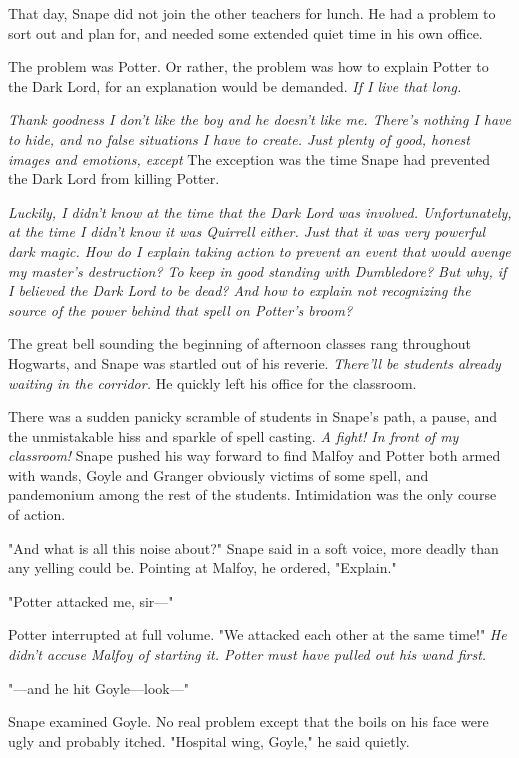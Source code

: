 That day, Snape did not join the other teachers for lunch. He had a problem to sort out and plan for, and needed some extended quiet time in his own office.

The problem was Potter. Or rather, the problem was how to explain Potter to the Dark Lord, for an explanation would be demanded. \emph{If I live that long.}

\emph{Thank goodness I don't like the boy and he doesn't like me. There's nothing I have to hide, and no false situations I have to create. Just plenty of good, honest images and emotions, except{\el}} The exception was the time Snape had prevented the Dark Lord from killing Potter.

\emph{Luckily, I didn't know at the time that the Dark Lord was involved. Unfortunately, at the time I didn't know it was Quirrell either. Just that it was very powerful dark magic. How do I explain taking action to prevent an event that would avenge my master's destruction? To keep in good standing with Dumbledore? But why, if I believed the Dark Lord to be dead? And how to explain not recognizing the source of the power behind that spell on Potter's broom?}

The great bell sounding the beginning of afternoon classes rang throughout Hogwarts, and Snape was startled out of his reverie. \emph{There'll be students already waiting in the corridor.} He quickly left his office for the classroom.

There was a sudden panicky scramble of students in Snape's path, a pause, and the unmistakable hiss and sparkle of spell casting. \emph{A fight! In front of my classroom!} Snape pushed his way forward to find Malfoy and Potter both armed with wands, Goyle and Granger obviously victims of some spell, and pandemonium among the rest of the students. Intimidation was the only course of action.

"And what is all this noise about?" Snape said in a soft voice, more deadly than any yelling could be. Pointing at Malfoy, he ordered, "Explain."

"Potter attacked me, sir—"

Potter interrupted at full volume. "We attacked each other at the same time!" \emph{He didn't accuse Malfoy of starting it. Potter must have pulled out his wand first.}

"—and he hit Goyle—look—"

Snape examined Goyle. No real problem except that the boils on his face were ugly and probably itched. "Hospital wing, Goyle," he said quietly.


